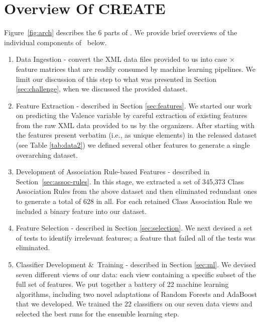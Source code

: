 \chapter{Overview Of CREATE}\label{sec:overview}
Figure~\ref{fig:arch} describes the 6 parts of \CREATE.
We provide brief overviews of the individual components of \CREATE\  below.


\begin{enumerate}
\item \textsf{Data Ingestion} - convert the XML data files provided to us into case $\times$ feature matrices that are readily consumed by machine learning pipelines. We limit our discussion of this step to what was presented in Section \ref{sec:challenge}, when we discussed the provided dataset.

 \item \textsf{Feature Extraction} - described in Section \ref{sec:features}.  We started our work on predicting the \textsf{Valence} variable by careful
extraction of existing features from the raw XML data provided to us by the  organizers.
After starting with the features present verbatim (i.e., as unique elements) in the released dataset (see Table \ref{tab:data2}) we defined several other features to generate a single overarching dataset.

 \item \textsf{Development of Association Rule-based Features} - described in Section~\ref{sec:assoc-rules}. In this stage, we extracted a set of 345,373 Class Association Rules from the above dataset and then eliminated redundant ones to generate a total of 628 in all. For each retained Class Association Rule we included a binary feature into our dataset.
 
 \item \textsf{Feature Selection} - described in Section \ref{sec:selection}. We next devised a set of tests to identify irrelevant features; a feature that failed all of the tests was eliminated.
 
 \item \textsf{Classifier Development \&\ Training} - described in Section \ref{sec:ml}. 
We devised seven different views of our data: each view containing a specific subset of the
full set of features. We put together a battery of 22 machine learning algorithms,
including two novel adaptations of Random Forests and AdaBoost that we developed.
We trained the 22 classifiers on our seven data views and selected the best runs
for the ensemble learning step.


\end{enumerate}
